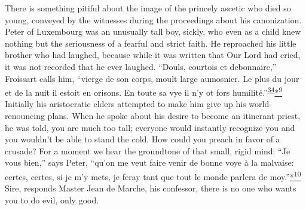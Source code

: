 There is something pitiful about the image of the princely ascetic who
died so young, conveyed by the witnesses during the proceedings about
his canonization. Peter of Luxembourg was an unusually tall boy, sickly,
who even as a child knew nothing but the seriousness of a fearful and
strict faith. He reproached his little brother who had laughed, because
while it was written that Our Lord had cried, it was not recorded that
he ever laughed. ``Douls, courtois et debonnaire,'' Froissart calls him,
``vierge de son corps, moult large aumosnier. Le plus du jour et de la
nuit il estoit en orisons. En toute sa vye il n'y ot fors
humilité.''\textsuperscript{\protect\hypertarget{14_Chapter_Seven__THE_PIOUS_PERSONA.xhtmlux5cux23id_956}{\protect\hyperlink{23_NOTES.xhtmlux5cux23id_957}{34}}}\protect\hypertarget{14_Chapter_Seven__THE_PIOUS_PERSONA.xhtmlux5cux23id_2557}{\protect\hyperlink{23_NOTES.xhtmlux5cux23id_2558}{*\textsuperscript{9}}}
Initially his aristocratic elders attempted to make him give up his
world-renouncing plans.
\protect\hypertarget{14_Chapter_Seven__THE_PIOUS_PERSONA.xhtmlux5cux23page_214}{}{}When
he spoke about his desire to become an itinerant priest, he was told,
you are much too tall; everyone would instantly recognize you and you
wouldn't be able to stand the cold. How could you preach in favor of a
crusade? For a moment we hear the groundtone of that small, rigid mind:
``Je vous bien,'' says Peter, ``qu'on me veut faire venir de bonne voye
à la malvaise: certes, certes, si je m'y mets, je feray tant que tout le
monde parlera de
moy.''\protect\hypertarget{14_Chapter_Seven__THE_PIOUS_PERSONA.xhtmlux5cux23id_2559}{\protect\hyperlink{23_NOTES.xhtmlux5cux23id_2560}{*\textsuperscript{10}}}
Sire, responds Master Jean de Marche, his confessor, there is no one who
wants you to do evil, only good.

